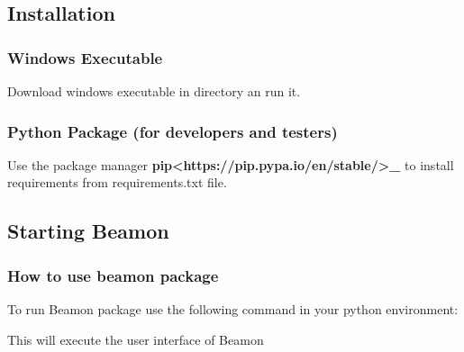 \documentclass[letterpaper,10pt,english]{sphinxmanual}
\begin{document}
\subsection{Installation}
\label{\detokenize{getting_started:installation}}

\subsubsection{Windows Executable}
\label{\detokenize{getting_started:windows-executable}}
Download windows executable in  directory an run it.


\subsubsection{Python Package (for developers and testers)}
\label{\detokenize{getting_started:python-package-for-developers-and-testers}}
Use the package manager {\color{red}\bfseries{}\textasciigrave{}pip\textless{}https://pip.pypa.io/en/stable/\textgreater{}\textasciigrave{}\_} to install requirements from requirements.txt file.


\subsection{Starting Beamon}
\label{\detokenize{getting_started:starting-beamon}}

\subsubsection{How to use beamon package}
\label{\detokenize{getting_started:how-to-use-beamon-package}}
To run Beamon package use the following command in your python environment:

\begin{sphinxVerbatim}[commandchars=\\\{\}]
  
\end{sphinxVerbatim}

This will execute the user interface of Beamon
\end{document}
